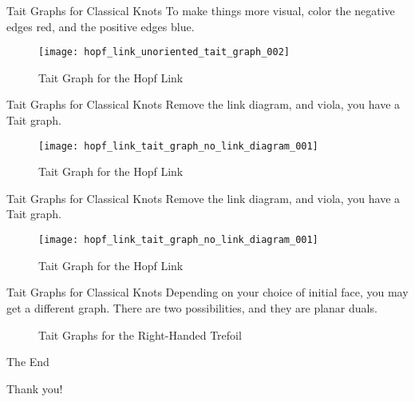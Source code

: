 \documentclass{beamer}
\begin{document}
    \begin{frame}{Tait Graphs for Classical Knots}
        To make things more visual, color the negative edges red, and the
        positive edges blue.
        \begin{figure}
            \centering
            \texttt{[image: hopf\_link\_unoriented\_tait\_graph\_002]}
            \label{fig:hopf_link_unoriented_tait_graph_002}
            \caption{Tait Graph for the Hopf Link}
        \end{figure}
    \end{frame}
    \begin{frame}{Tait Graphs for Classical Knots}
        Remove the link diagram, and viola, you have a Tait graph.
        \begin{figure}
            \centering
            \texttt{[image: hopf\_link\_tait\_graph\_no\_link\_diagram\_001]}
            \label{fig:hopf_link_tait_graph_no_link_diagram_001}
            \caption{Tait Graph for the Hopf Link}
        \end{figure}
    \end{frame}
    \begin{frame}{Tait Graphs for Classical Knots}
        Remove the link diagram, and viola, you have a Tait graph.
        \begin{figure}
            \centering
            \texttt{[image: hopf\_link\_tait\_graph\_no\_link\_diagram\_001]}
            \label{fig:hopf_link_tait_graph_no_link_diagram_001}
            \caption{Tait Graph for the Hopf Link}
        \end{figure}
    \end{frame}
    \begin{frame}{Tait Graphs for Classical Knots}
        Depending on your choice of initial face, you may get a different
        graph. There are two possibilities, and they are planar duals.
        \begin{figure}
            \centering
            \label{fig:trefoil_tait_graph_with_both_graphs_and_knot_diagram_001}
            \caption{Tait Graphs for the Right-Handed Trefoil}
        \end{figure}
    \end{frame}
    \begin{frame}{The End}
        \begin{center}
            Thank you!
        \end{center}
    \end{frame}
\end{document}
